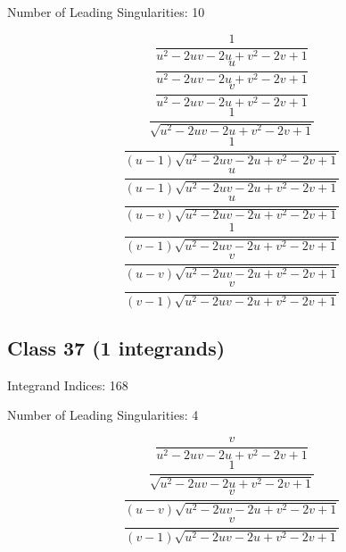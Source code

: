 \documentclass[11pt,a4paper]{article}
\begin{document}
Number of Leading Singularities: 10

\begin{equation}
\frac{1}{u^2-2 u v-2 u+v^2-2 v+1}
\end{equation}
\begin{equation}
\frac{u}{u^2-2 u v-2 u+v^2-2 v+1}
\end{equation}
\begin{equation}
\frac{v}{u^2-2 u v-2 u+v^2-2 v+1}
\end{equation}
\begin{equation}
\frac{1}{\sqrt{u^2-2 u v-2 u+v^2-2 v+1}}
\end{equation}
\begin{equation}
\frac{1}{(u-1) \sqrt{u^2-2 u v-2 u+v^2-2 v+1}}
\end{equation}
\begin{equation}
\frac{u}{(u-1) \sqrt{u^2-2 u v-2 u+v^2-2 v+1}}
\end{equation}
\begin{equation}
\frac{u}{(u-v) \sqrt{u^2-2 u v-2 u+v^2-2 v+1}}
\end{equation}
\begin{equation}
\frac{1}{(v-1) \sqrt{u^2-2 u v-2 u+v^2-2 v+1}}
\end{equation}
\begin{equation}
\frac{v}{(u-v) \sqrt{u^2-2 u v-2 u+v^2-2 v+1}}
\end{equation}
\begin{equation}
\frac{v}{(v-1) \sqrt{u^2-2 u v-2 u+v^2-2 v+1}}
\end{equation}


\subsection*{Class 37 (1 integrands)}
Integrand Indices: 168

Number of Leading Singularities: 4

\begin{equation}
\frac{v}{u^2-2 u v-2 u+v^2-2 v+1}
\end{equation}
\begin{equation}
\frac{1}{\sqrt{u^2-2 u v-2 u+v^2-2 v+1}}
\end{equation}
\begin{equation}
\frac{v}{(u-v) \sqrt{u^2-2 u v-2 u+v^2-2 v+1}}
\end{equation}
\begin{equation}
\frac{v}{(v-1) \sqrt{u^2-2 u v-2 u+v^2-2 v+1}}
\end{equation}
\end{document}

